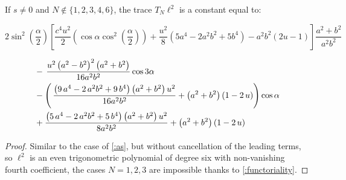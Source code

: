 If $s{\neq}0$ and $N{\notin}\{1,2,3,4,6\}$, the trace $T_N \ell^2$ is a constant equal to:
{\small  
\begin{equation}
\label{:ell2}
 2 \sin^2\left(\frac{α}{2}\right) \left[ \frac{c^4 u^2}{2}\left ( \cos α \cos^2\left(\frac{α}{2}\right) \right) +\frac{u^2}{8}( 5a^4  - 2a^2b^2  +  5b^4 )  - a^2b^2(2 u - 1)\right] \frac{ a^2+b^2}{a^2 b^2}
\end{equation}

\begin{equation}\aligned
 & - \,{\frac {{u}^{2} \left( {a}^{2}-{b}^{2} \right) ^{2} \left( {a}^
{2}+{b}^{2} \right) }{16{a}^{2}{b}^{2}}}\cos 3\alpha\\
&-\left( \,{\frac { \left( 9\,{a}^{4}-2\,{a}^{2}{b}^{2}+9\,{b}^{4}
 \right)  \left( {a}^{2}+{b}^{2} \right) {u}^{2}}{16{a}^{2}{b}^{2}}}+
 \left( {a}^{2}+{b}^{2} \right)  \left( 1-2\,u \right) 
\right)\cos\alpha\\
&+\frac { \left( 5\,{a}^{4}-2\,{a}^{2}{b}^{2}+5\,{b}^{4} \right) 
 \left( {a}^{2}+{b}^{2} \right) {u}^{2}}{8{a}^{2}{b}^{2}}+ \left( {a}^
{2}+{b}^{2} \right)  \left( 1-2\,u \right) 
\endaligned
\end{equation}

}
\begin{proof}
Similar to the case of \cref{:as}, but without cancellation of the leading terms,
so $\ell^2$ is an even trigonometric polynomial of degree six with non-vanishing
fourth coefficient, the cases $N=1,2,3$ are impossible thanks to \cref{:functoriality}. %
\end{proof}
